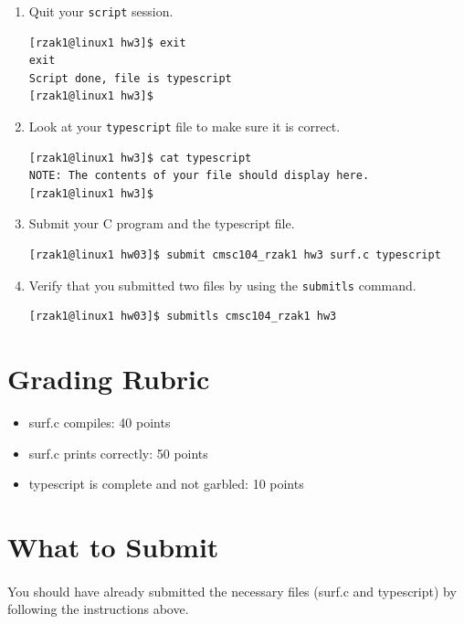 \documentclass[letter,11pt]{article}
\begin{document}
\begin{enumerate}
\begin{verbatim}
[rzak1@linux1 hw3]$ ./a.out
    \end{verbatim}
    \item Quit your \texttt{script} session.
    \begin{verbatim}
[rzak1@linux1 hw3]$ exit
exit
Script done, file is typescript
[rzak1@linux1 hw3]$
    \end{verbatim}
    \item Look at your \texttt{typescript} file to make sure it is correct.
    \begin{verbatim}
[rzak1@linux1 hw3]$ cat typescript
NOTE: The contents of your file should display here.
[rzak1@linux1 hw3]$ 
    \end{verbatim}
    \item Submit your C program and the typescript file.
    \begin{verbatim}
[rzak1@linux1 hw03]$ submit cmsc104_rzak1 hw3 surf.c typescript
    \end{verbatim}
    \item Verify that you submitted two files by using the \texttt{submitls} command.
    \begin{verbatim}
[rzak1@linux1 hw03]$ submitls cmsc104_rzak1 hw3
    \end{verbatim}
\end{enumerate}

\section*{Grading Rubric}
\begin{itemize}
    \item surf.c compiles: 40 points
    \item surf.c prints correctly: 50 points
    \item typescript is complete and not garbled: 10 points
\end{itemize}

\section*{What to Submit}
\paragraph{}You should have already submitted the necessary files (surf.c and typescript) by following the instructions above.
\end{document}
